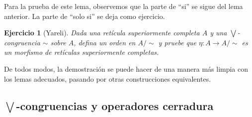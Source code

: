 \documentclass[12pt,letterpaper,titlepage]{article}
\newtheorem{exe}{Ejercicio}
\theoremstyle{definition}
\newcommand\Sup{\bigvee}
\newcommand\simr{{\sim}}
\newcommand\tps[1]{\texorpdfstring{#1}{}}
\newcommand\<{\langle}
\renewcommand\>{\rangle}
\begin{document}
Para la prueba de este lema, observemos que la parte de ``si'' se sigue
del lema anterior.
La parte de ``solo si'' se deja como ejercicio.
\begin{exe}[Yareli]
    Dada una retícula superiormente completa $A$ y una $\Sup$-congruencia
    $\simr$ sobre $A$, defina un orden en $A/\simr$ y pruebe que
    $\eta:A\to A/\simr$ es un morfismo de retículas superiormente completas.
\end{exe}

De todos modos, la demostración se puede hacer de una manera más limpia con los
lemas adecuados, pasando por otras construcciones equivalentes.

\subsection{\tps{$\Sup$}-congruencias y operadores cerradura}
\end{document}
